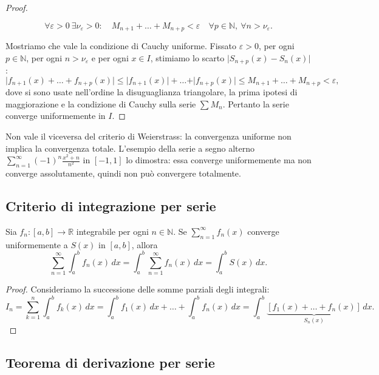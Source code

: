\begin{proof}
\begin{enumerate}
$$\forall \varepsilon > 0 \ \exists \nu_{\varepsilon} > 0 : \quad M_{n+1} + \dots + M_{n+p} < \varepsilon \quad \forall p \in \mathbb{N}, \ \forall n > \nu_{\varepsilon}.$$
\end{enumerate}
Mostriamo che vale la condizione di Cauchy uniforme. Fissato $\varepsilon > 0$, per ogni $p \in \mathbb{N}$, per ogni $n > \nu_{\varepsilon}$ e per ogni $x \in I$, stimiamo lo scarto $\vert{}S_{n+p}(x) - S_n(x)\vert{}$:
$$\vert{}f_{n+1}(x) + \dots + f_{n+p}(x)\vert{} \le \vert{}f_{n+1}(x)\vert{} + \dots + \vert{}f_{n+p}(x)\vert{} \le M_{n+1} + \dots + M_{n+p} < \varepsilon,$$
dove si sono usate nell'ordine la disuguaglianza triangolare, la prima ipotesi di maggiorazione e la condizione di Cauchy sulla serie $\sum M_n$. Pertanto la serie converge uniformemente in $I$.
\end{proof}\begin{oss}
Non vale il viceversa del criterio di Weierstrass: la convergenza uniforme non implica la convergenza totale. L'esempio della serie a segno alterno $\sum_{n=1}^{\infty} (-1)^n \frac{x^2 + n}{n^2}$ in $[-1, 1]$ lo dimostra: essa converge uniformemente ma non converge assolutamente, quindi non può convergere totalmente.
\end{oss}

\subsection{Criterio di integrazione per serie}

\begin{theorem}
Sia $f_n : [a, b] \to \mathbb{R}$ integrabile per ogni $n \in \mathbb{N}$. Se $\sum_{n=1}^{\infty} f_n(x)$ converge uniformemente a $S(x)$ in $[a, b]$, allora
$$\sum_{n=1}^{\infty} \int_a^b f_n(x) \, dx = \int_a^b \sum_{n=1}^{\infty} f_n(x) \, dx = \int_a^b S(x) \, dx.$$
\end{theorem}\begin{proof}
Consideriamo la successione delle somme parziali degli integrali:
$$I_n = \sum_{k=1}^{n} \int_a^b f_k(x) \, dx = \int_a^b f_1(x) \, dx + \dots + \int_a^b f_n(x) \, dx = \int_a^b \underbrace{\left[ f_1(x) + \dots + f_n(x) \right]}_{S_n(x)} \, dx.$$
\end{proof}

\subsection{Teorema di derivazione per serie}

